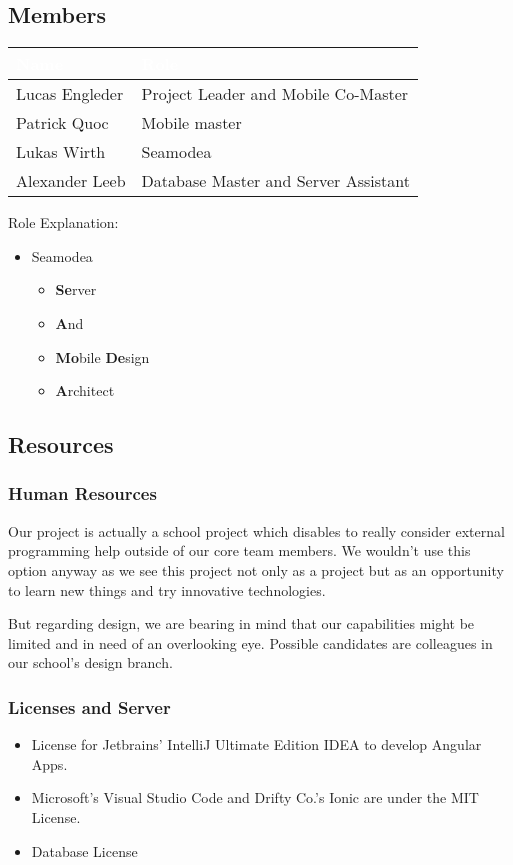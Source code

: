 \documentclass[12pt]{article}
\theoremstyle{definition}
\newenvironment{text}{
}{}
\begin{document}
\subsection{Members}
\begin{tabular}{|l|l|}
\hline
\cellcolor[gray]{0.5}\textcolor{white}{Name} & \cellcolor[gray]{0.5}\textcolor{white}{Role}\\ \hline
Lucas Engleder & Project Leader and Mobile Co-Master\\ \hline
Patrick Quoc & Mobile master\\ \hline
Lukas Wirth & Seamodea \\  \hline
Alexander Leeb & Database Master and Server Assistant \\ \hline
\end{tabular}

Role Explanation:
\begin{itemize}
    \item Seamodea
    \begin{itemize}
        \item \textbf{Se}rver
        \item \textbf{A}nd
        \item \textbf{Mo}bile \textbf{De}sign
        \item \textbf{A}rchitect
    \end{itemize} 
\end{itemize}
\subsection{Resources}
\subsubsection{Human Resources}
\begin{text}
Our project is actually a school project which disables to really consider external programming help outside of our core team members. We wouldn't use this option anyway as we see this project not only as a project but as an opportunity to learn new things and try innovative technologies.

But regarding design, we are bearing in mind that our capabilities might be limited and in need of an overlooking eye. Possible candidates are colleagues in our school's design branch.\end{text}

\subsubsection{Licenses and Server}
\begin{itemize}
\item License for Jetbrains' IntelliJ Ultimate Edition IDEA to develop Angular Apps.
\item Microsoft's Visual Studio Code and Drifty Co.'s Ionic are under the MIT License.
\item Database License
\end{itemize}
\end{document}
